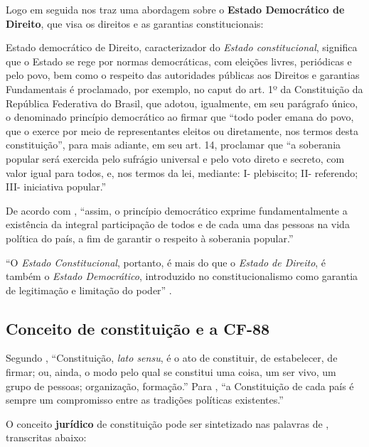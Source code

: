 \documentclass[
	10pt,				%
	openright,			%
	twoside,			%
	a5paper,			%
	english,			%
	french,				%
	spanish,			%
	brazil				%
	]{abntex2}
\renewenvironment{quote}
  {\small\list{}{\rightmargin=0.1cm \leftmargin=4cm}%
   \item\relax}
  {\endlist}
\begin{document}
Logo em seguida  nos traz uma abordagem sobre o
\textbf{Estado Democrático de Direito}, que visa os direitos e as
garantias constitucionais:

\begin{quote}
Estado democrático de Direito, caracterizador do \emph{Estado
constitucional}, significa que o Estado se rege por normas democráticas,
com eleições livres, periódicas e pelo povo, bem como o respeito das
autoridades públicas aos Direitos e garantias Fundamentais é proclamado,
por exemplo, no caput do art. 1º da Constituição da República Federativa
do Brasil, que adotou, igualmente, em seu parágrafo único, o denominado
princípio democrático ao firmar que ``todo poder emana do povo, que o
exerce por meio de representantes eleitos ou diretamente, nos termos
desta constituição'', para mais adiante, em seu art. 14, proclamar que
``a soberania popular será exercida pelo sufrágio universal e pelo voto
direto e secreto, com valor igual para todos, e, nos termos da lei,
mediante: I- plebiscito; II- referendo; III- iniciativa popular.''
\end{quote}

De acordo com , ``assim, o princípio
democrático exprime fundamentalmente a existência da integral
participação de todos e de cada uma das pessoas na vida política do
país, a fim de garantir o respeito à soberania popular.''

``O \emph{Estado Constitucional}, portanto, é mais do que o \emph{Estado
de Direito}, é também o \emph{Estado Democrático}, introduzido no
constitucionalismo como garantia de legitimação e limitação do poder''
\cite[p.~6]{moraes}.

\subsection{Conceito de constituição e a
CF-88}\label{conceito-de-constituiuxe7uxe3o-e-a-cf-88}

Segundo , ``Constituição, \emph{lato sensu}, é
o ato de constituir, de estabelecer, de firmar; ou, ainda, o modo pelo
qual se constitui uma coisa, um ser vivo, um grupo de pessoas;
organização, formação.'' Para ,
``a Constituição de cada país é sempre um compromisso entre as tradições
políticas existentes.''

O conceito \textbf{jurídico} de constituição pode ser sintetizado nas
palavras de , transcritas abaixo:
\end{document}

